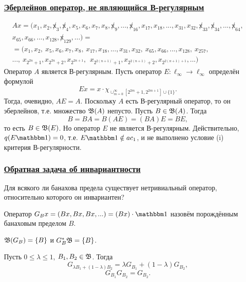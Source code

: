 \begin{frame}\frametitle{\underline{Эберлейнов оператор, не являющийся В-регулярным}}
	\begin{multline}
		\label{eq:oper_A_throws_out_2power_blocks}
		Ax = (x_1, x_2, \not x_3, \not x_4, x_5, x_6, x_7, x_8, \not x_9, ..., \not x_{16}, x_{17}, x_{18}, ..., x_{31}, x_{32}, \not x_{33}, \not x_{34}, ..., \not x_{64},
		\\
		x_{65}, x_{66}, ..., x_{128}, \not x_{129}, ...)=
		\\=
		(x_1, x_2, \ x_5, x_6, x_7, x_8, \ x_{17}, x_{18}, ..., x_{31}, x_{32}, \ x_{65}, x_{66}, ..., x_{128}, \ x_{257},
		\\
		..., \ x_{2^{2n} +1}, x_{2^{2n} +2},  x_{2^{2n+1}}, \ \ x_{2^{2(n+1)} +1},  x_{2^{2(n+1)} +2},  x_{2^{2(n+1)+1}}, ...)
	\end{multline}
	Оператор $A$ является В-регулярным.
	Пусть оператор $E:\ell_\infty\to\ell_\infty$ определён формулой
	\begin{equation}
		Ex = x \cdot \chi_{\cup_{m=0}^{\infty}\left[2^{2 m}+1, 2^{2 m+1}\right] \cup\{1\}}
		.
	\end{equation}
	Тогда, очевидно, $AE=A$.
	Поскольку $A$ есть В-регулярный оператор, то он эберлейнов,
	т.е. множество $\mathfrak{B}(A)$ непусто.
	Пусть $B\in\mathfrak{B}(A)$. Тогда
	\begin{equation}
		B = BA = B(AE) = (BA)E = BE
		,
	\end{equation}
	то есть $B\in\mathfrak{B}(E)$.
	Но оператор $E$ не является В-регулярным.
	Действительно, $q(E\one) =0$, т.е. $ E\one \notin ac_1$,
	и не выполнено условие (i) критерия В-регулярности.
\end{frame}


\begin{frame}\frametitle{\underline{Обратная задача об инвариантности}}
	Для всякого ли банахова предела существует нетривиальный оператор, относительно которого он инвариантен?
	\vfill
	\begin{ddefinition}
		Оператор $G_B x = (Bx, Bx, Bx, ...) = (Bx)\cdot\one$
		назовём порождённым банаховым пределом $B$.
	\end{ddefinition}
	\vfill
	\begin{ttheorem}
		$\mathfrak{B}(G_B) = \{B\}$ и $G_B^* \mathfrak{B} = \{B\}$.
	\end{ttheorem}
	\vfill
	\begin{llemma}
		Пусть $0 \leq \lambda \leq 1$, $B_1, B_2 \in \mathfrak{B}$.
		Тогда
		\begin{equation}
			G_{\lambda B_1+(1-\lambda) B_2} =\lambda G_{B_1} + (1-\lambda)G_{B_2}
			,
		\end{equation}
		\begin{equation}
			G_{B_1} G_{B_2} = G_{B_2}
			.
		\end{equation}
	\end{llemma}
\end{frame}


